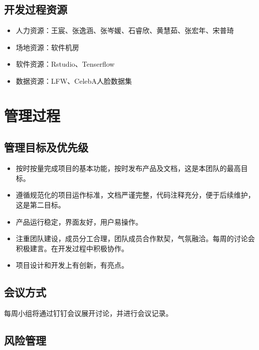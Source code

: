 \documentclass[
  hyperref, a4paper]{ctexart}
\providecommand{\tightlist}{%
  \setlength{\itemsep}{0pt}\setlength{\parskip}{0pt}}
\begin{document}
\hypertarget{ux5f00ux53d1ux8fc7ux7a0bux8d44ux6e90}{%
\subsection{开发过程资源}\label{ux5f00ux53d1ux8fc7ux7a0bux8d44ux6e90}}

\begin{itemize}
\tightlist
\item
  人力资源：王宸、张逸涵、张岑媛、石睿欣、黄慧茹、张宏年、宋普琦
\item
  场地资源：软件机房
\item
  软件资源：Rstudio、Tenserflow
\item
  数据资源：LFW、CelebA人脸数据集
\end{itemize}

\hypertarget{ux7ba1ux7406ux8fc7ux7a0b}{%
\section{管理过程}\label{ux7ba1ux7406ux8fc7ux7a0b}}

\hypertarget{ux7ba1ux7406ux76eeux6807ux53caux4f18ux5148ux7ea7}{%
\subsection{管理目标及优先级}\label{ux7ba1ux7406ux76eeux6807ux53caux4f18ux5148ux7ea7}}

\begin{itemize}
\tightlist
\item
  按时按量完成项目的基本功能，按时发布产品及文档，这是本团队的最高目标。
\item
  遵循规范化的项目运作标准，文档严谨完整，代码注释充分，便于后续维护，这是第二目标。
\item
  产品运行稳定，界面友好，用户易操作。
\item
  注重团队建设，成员分工合理，团队成员合作默契，气氛融洽。每周的讨论会积极建言。在开发过程中积极协作。
\item
  项目设计和开发上有创新，有亮点。
\end{itemize}

\hypertarget{ux4f1aux8baeux65b9ux5f0f}{%
\subsection{会议方式}\label{ux4f1aux8baeux65b9ux5f0f}}

每周小组将通过钉钉会议展开讨论，并进行会议记录。

\hypertarget{ux98ceux9669ux7ba1ux7406}{%
\subsection{风险管理}\label{ux98ceux9669ux7ba1ux7406}}
\end{document}
